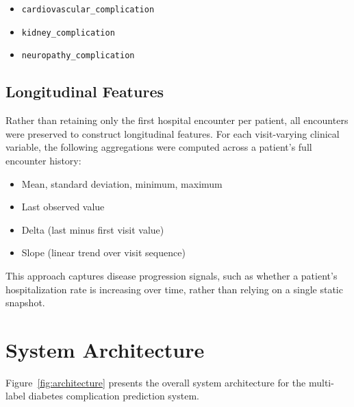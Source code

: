 \documentclass[12pt]{article}
\begin{document}
\begin{itemize}
  \item \texttt{cardiovascular\_complication}
  \item \texttt{kidney\_complication}
  \item \texttt{neuropathy\_complication}
\end{itemize}

\subsection{Longitudinal Features}

Rather than retaining only the first hospital encounter per patient, all encounters were
preserved to construct longitudinal features. For each visit-varying clinical variable,
the following aggregations were computed across a patient's full encounter history:

\begin{itemize}
  \item Mean, standard deviation, minimum, maximum
  \item Last observed value
  \item Delta (last minus first visit value)
  \item Slope (linear trend over visit sequence)
\end{itemize}

This approach captures disease progression signals, such as whether a patient's
hospitalization rate is increasing over time, rather than relying on a single static
snapshot.


\section{System Architecture}

Figure~\ref{fig:architecture} presents the overall system architecture for the multi-label
diabetes complication prediction system.
\end{document}
